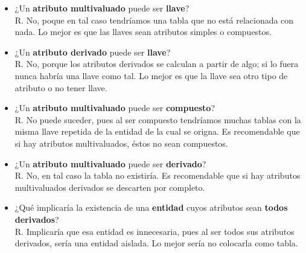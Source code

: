 \documentclass[12pt, letterpaper]{article}
\begin{document}
\begin{itemize}
\begin{itemize}
                          \item ¿Un \textbf{atributo multivaluado} puede ser 
                                \textbf{llave}? \\

                                R. No, poque en tal caso tendríamos una tabla que 
                                   no está relacionada con nada. Lo mejor es que 
                                   las llaves sean atributos simples o compuestos.\\

                          \item ¿Un \textbf{atributo derivado} puede ser 
                                \textbf{llave}? \\
                                R. No, porque los atributos derivados se calculan a
                                partir de algo; si lo fuera nunca habría una llave 
                                como tal. Lo mejor es que la llave sea otro tipo de 
                                atributo o no tener llave.\\

                          \item ¿Un \textbf{atributo multivaluado} puede ser 
                                \textbf{compuesto}? \\
                                R. No puede suceder, pues al ser compuesto tendríamos
                                muchas tablas con la misma llave repetida de la entidad
                                de la cual se origna. Es recomendable que si hay atributos
                                multivaluados, éstos no sean compuestos.\\

                          \item ¿Un \textbf{atributo multivaluado} puede ser 
                                \textbf{derivado}?\\ 
                                R. No, en tal caso la tabla no existiría. Es recomendable
                                que si hay atributos multivaluados derivados se descarten
                                por completo. \\

                          \item ¿Qué implicaría la existencia de una 
                                \textbf{entidad} cuyos atributos sean 
                                \textbf{todos derivados}? \\
                                R. Implicaría que esa entidad es innecesaria, pues al ser
                                todos sus atributos derivados, sería una entidad aislada.
                                Lo mejor sería no colocarla como tabla.\\


\end{itemize}
\end{itemize}
\end{document}

